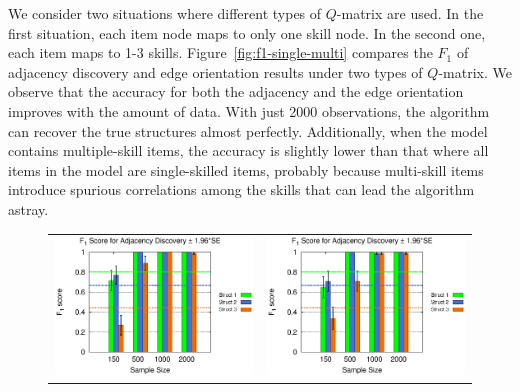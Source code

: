 \documentclass{edm_template}
\begin{document}
	We consider two situations where different types of $Q$-matrix are used. In the first situation,
	each item node maps to only one skill node. In the second one, each item maps to 1-3 skills. 
	Figure~\ref{fig:f1-single-multi} compares the $F_1$ of adjacency discovery and edge orientation results under two types of $Q$-matrix.
	We observe that the accuracy for both the adjacency and the edge orientation  improves with the amount of data.
	With just 2000 observations, the algorithm can recover the true structures almost perfectly.
	Additionally, when the model contains multiple-skill items, the accuracy is slightly lower than that where all items in the model are single-skilled items,
	probably because multi-skill items introduce spurious correlations among the skills that can lead the algorithm astray. 
	
	\begin{figure}[!ht]
		\begin{center}
			\begin{tabular}{>{\centering}m{1.5in} >{\centering\arraybackslash}m{1.5in}}
				\includegraphics[width=1.1\linewidth]{figures/F1A_single.eps} &\includegraphics[width=1.1\linewidth]{figures/F1A_multi.eps}\\

\end{tabular}
\end{center}
\end{figure}
\end{document}
